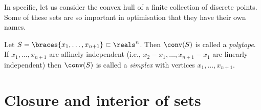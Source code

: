 In specific, let us consider the convex hull of a finite collection of discrete points. Some of these sets are so important in optimisation that they have their own names. 
%
\begin{definition}
Let $S = \braces{x_1, \dots, x_{n+1}} \subset \reals^n$. Then $\conv(S)$ is called a \emph{polytope}. If $x_1,\dots,x_{n+1}$ are affinely independent (i.e., $x_2 - x_1, \dots ,x_{n+1} - x_1$ are linearly independent) then $\conv(S)$ is called a \emph{simplex} with vertices $x_1,\dots,x_{n+1}$.
\end{definition}
%


%
%
%
%
%


\section{Closure and interior of sets}

